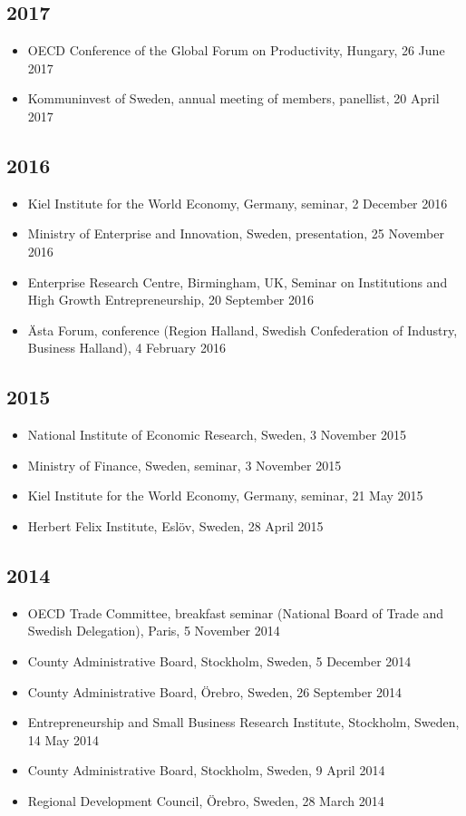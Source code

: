 \documentclass[11pt,a4paper]{article}
\newcommand{\cventry}[1]{\item #1}
\begin{document}
\subsection{2017}
\begin{itemize}
  \cventry{OECD Conference of the Global Forum on Productivity, Hungary, 26 June 2017}
  \cventry{Kommuninvest of Sweden, annual meeting of members, panellist, 20 April 2017}
\end{itemize}

\subsection{2016}
\begin{itemize}
  \cventry{Kiel Institute for the World Economy, Germany, seminar, 2 December 2016}
  \cventry{Ministry of Enterprise and Innovation, Sweden, presentation, 25 November 2016}
  \cventry{Enterprise Research Centre, Birmingham, UK, Seminar on Institutions and High Growth Entrepreneurship, 20 September 2016}
  \cventry{Ästa Forum, conference (Region Halland, Swedish Confederation of Industry, Business Halland), 4 February 2016}
\end{itemize}

\subsection{2015}
\begin{itemize}
  \cventry{National Institute of Economic Research, Sweden, 3 November 2015}
  \cventry{Ministry of Finance, Sweden, seminar, 3 November 2015}
  \cventry{Kiel Institute for the World Economy, Germany, seminar, 21 May 2015}
  \cventry{Herbert Felix Institute, Eslöv, Sweden, 28 April 2015}
\end{itemize}

\subsection{2014}
\begin{itemize}
  \cventry{OECD Trade Committee, breakfast seminar (National Board of Trade and Swedish Delegation), Paris, 5 November 2014}
  \cventry{County Administrative Board, Stockholm, Sweden, 5 December 2014}
  \cventry{County Administrative Board, Örebro, Sweden, 26 September 2014}
  \cventry{Entrepreneurship and Small Business Research Institute, Stockholm, Sweden, 14 May 2014}
  \cventry{County Administrative Board, Stockholm, Sweden, 9 April 2014}
  \cventry{Regional Development Council, Örebro, Sweden, 28 March 2014}
\end{itemize}
\end{document}
